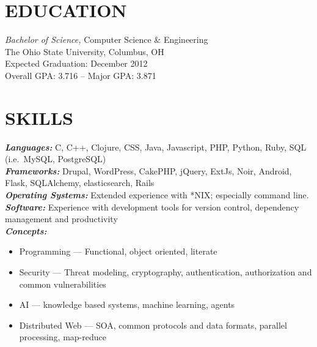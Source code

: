 \documentclass[line,letterpaper]{resume}
\begin{document}
\address{2092 Middlesex road, Columbus, OH 43220}
\address{\href{mailto:ryan@ryanmcg.com}{ryan@ryanmcg.com} --- (614) 678-4408}


\begin{resume}
    \vspace{-24pt}
    \section{\uppercase{Education}} {\sl Bachelor of Science,} \/
    Computer Science \& Engineering \\
    The Ohio State University, Columbus, OH \\
    Expected Graduation: December 2012 \\
    Overall GPA: 3.716 -- Major GPA: 3.871 \\

    \vspace{-16pt}

    \section{\uppercase{Skills}}
    {\sl\textbf{Languages:}}\/
    C, C++, Clojure, CSS, Java, Javascript, PHP, Python, Ruby, SQL
    (i.e.~MySQL, PostgreSQL) \\
    {\sl\textbf{Frameworks:}}\/
    Drupal, WordPress, CakePHP, jQuery, ExtJs, Noir, Android, Flask,
    SQLAlchemy, elasticsearch, Rails \\
    {\sl\textbf{Operating Systems:}}\/
    Extended experience with *NIX; especially command line. \\
    {\sl\textbf{Software:}}\/
    Experience with development tools for version
    control, dependency management and productivity \\
    {\sl\textbf{Concepts:}}
    \begin{itemize}
        \item Programming --- Functional, object oriented, literate
        \item Security --- Threat modeling, cryptography, authentication,
            authorization and common vulnerabilities
        \item AI --- knowledge based systems, machine learning, agents
        \item Distributed Web --- SOA, common protocols and data formats,
            parallel processing, map-reduce
    \end{itemize}


\end{resume}
\end{document}
